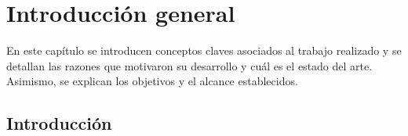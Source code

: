 
\chapter{Introducción general} %

\label{Chapter1} %
\label{IntroGeneral}


\newcommand{\keyword}[1]{\textbf{#1}}
\newcommand{\tabhead}[1]{\textbf{#1}}
\newcommand{\code}[1]{\texttt{#1}}
\newcommand{\file}[1]{\texttt{\bfseries#1}}
\newcommand{\option}[1]{\texttt{\itshape#1}}
\newcommand{\grados}{$^{\circ}$}


En este capítulo se introducen conceptos claves asociados al trabajo realizado y se detallan las razones que motivaron su desarrollo y cuál es el estado del arte. Asimismo, se explican los objetivos y el alcance establecidos.
\section{Introducción}
\label{Introducción}



